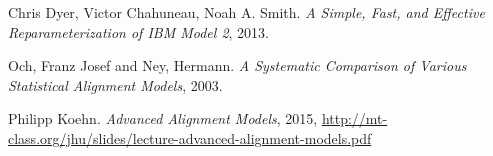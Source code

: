 \documentclass[11pt]{article}
\begin{document}
\begin{thebibliography}{50}
 Chris Dyer, Victor Chahuneau, Noah A. Smith. \textsl{A Simple, Fast, and Effective Reparameterization of IBM Model 2}, 2013.

 Och, Franz Josef and Ney, Hermann. \textsl{A Systematic Comparison of Various Statistical Alignment Models}, 2003.

 Philipp Koehn. \textsl{Advanced Alignment Models}, 2015, \url{http://mt-class.org/jhu/slides/lecture-advanced-alignment-models.pdf}
\end{thebibliography}
\end{document}
